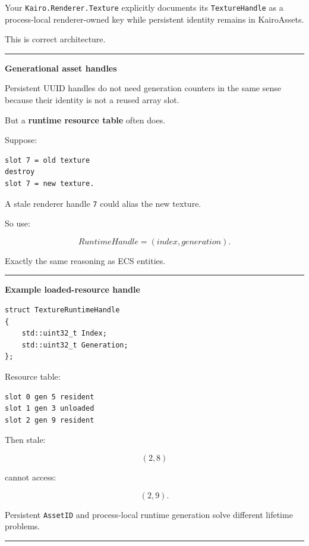 Your \texttt{Kairo.Renderer.Texture} explicitly documents its \texttt{TextureHandle} as a process-local renderer-owned key while persistent identity remains in KairoAssets.

This is correct architecture.

\begin{center}\rule{0.5\linewidth}{0.5pt}\end{center}

\textbf{Generational asset handles}

Persistent UUID handles do not need generation counters in the same sense because their identity is not a reused array slot.

But a \textbf{runtime resource table} often does.

Suppose:

\begin{verbatim}
slot 7 = old texture
destroy
slot 7 = new texture.
\end{verbatim}

A stale renderer handle \texttt{7} could alias the new texture.

So use:

\[
RuntimeHandle=(index,generation).
\]

Exactly the same reasoning as ECS entities.

\begin{center}\rule{0.5\linewidth}{0.5pt}\end{center}

\textbf{Example loaded-resource handle}

\begin{verbatim}
struct TextureRuntimeHandle
{
    std::uint32_t Index;
    std::uint32_t Generation;
};
\end{verbatim}

Resource table:

\begin{verbatim}
slot 0 gen 5 resident
slot 1 gen 3 unloaded
slot 2 gen 9 resident
\end{verbatim}

Then stale:

\[
(2,8)
\]

cannot access:

\[
(2,9).
\]

Persistent \texttt{AssetID} and process-local runtime generation solve different lifetime problems.

\begin{center}\rule{0.5\linewidth}{0.5pt}\end{center}

